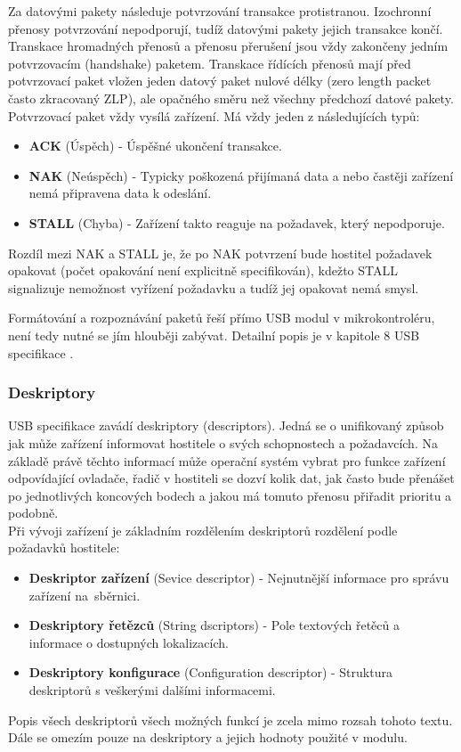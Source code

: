 Za datovými pakety následuje potvrzování transakce protistranou. Izochronní přenosy potvrzování nepodporují, tudíž datovými pakety jejich transakce končí. Transkace hromadných přenosů a přenosu přerušení jsou vždy zakončeny jedním potvrzovacím (handshake) paketem.  Transkace řídících přenosů mají před potvrzovací paket vložen jeden datový paket nulové délky (zero length packet často zkracovaný ZLP), ale opačného směru než všechny předchozí datové pakety. Potvrzovací paket vždy vysílá zařízení. Má vždy jeden z následujících typů:
\begin{itemize}
\item \textbf{ACK} (Úspěch) - Úspěšné ukončení transakce.
\item \textbf{NAK} (Neúspěch) - Typicky poškozená přijímaná data a nebo častěji zařízení nemá připravena data k odeslání.
\item \textbf{STALL} (Chyba) - Zařízení takto reaguje na požadavek, který nepodporuje.
\end{itemize}
Rozdíl mezi NAK a STALL je, že po NAK potvrzení bude hostitel požadavek opakovat (počet opakování není explicitně specifikován), kdežto STALL signalizuje nemožnost vyřízení požadavku a tudíž jej opakovat nemá smysl.

Formátování a rozpoznávání paketů řeší přímo USB modul v mikrokontroléru, není tedy nutné se jím hlouběji zabývat. Detailní popis je v kapitole 8 USB specifikace \cite{usb-spec}.


\subsubsection{Deskriptory}
USB specifikace zavádí deskriptory (descriptors). Jedná se o unifikovaný způsob jak může zařízení informovat hostitele o svých schopnostech a požadavcích. Na základě právě těchto informací může operační systém vybrat pro funkce zařízení odpovídající ovladače, řadič v hostiteli se dozví kolik dat, jak často bude přenášet po jednotlivých koncových bodech a jakou má tomuto přenosu přiřadit prioritu a podobně.\\
Při vývoji zařízení je základním rozdělením deskriptorů rozdělení podle požadavků hostitele:
\begin{itemize}
\item \textbf{Deskriptor zařízení} (Sevice descriptor) - Nejnutnější informace pro správu zařízení na~sběrnici.
\item \textbf{Deskriptory řetězců} (String dscriptors) - Pole textových řetěců a informace o dostupných lokalizacích.
\item \textbf{Deskriptory konfigurace} (Configuration descriptor) - Struktura deskriptorů s veškerými dalšími informacemi.
\end{itemize}
Popis všech deskriptorů všech možných funkcí je zcela mimo rozsah tohoto textu. Dále se omezím pouze na deskriptory a jejich hodnoty použité v modulu.


